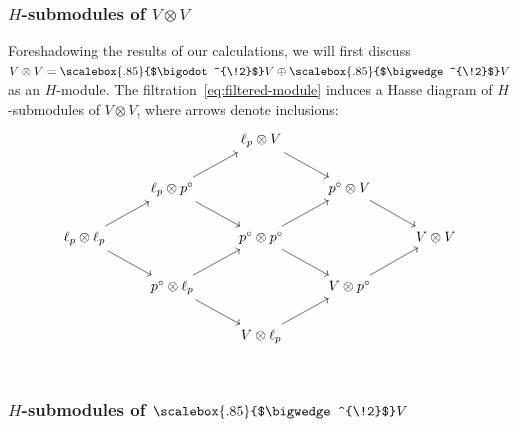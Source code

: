 \documentclass[11pt,reqno,a4paper,final]{amsart}
\newcommand\ext[1]{\scalebox{.85}{$\bigwedge^{\!#1}$}}
\newcommand\sym[1]{\scalebox{.85}{$\bigodot^{\!#1}$}}
\theoremstyle{plain}
\theoremstyle{definition}
\newcommand{\1}{\mathbb{1}}
\numberwithin{equation}{section}
\begin{document}
\subsubsection{$H$-submodules of $V \otimes V$}
\label{sec:some-submodules-v}

Foreshadowing the results of our calculations, we will first discuss
$V \otimes V = \sym{2} V \oplus \ext{2}V$ as an $H$-module. The
filtration~\eqref{eq:filtered-module} induces a Hasse diagram of
$H$-submodules of $V \otimes V$, where arrows denote inclusions:
\begin{equation}
  \label{eq:VtensorV-as-H-mod}
  \begin{tikzcd}
    & & \ell_p \otimes V \arrow[rd] & & \\
    & \ell_p \otimes p^\circ  \arrow[rd] \arrow[ru] & & p^\circ \otimes V \arrow[dr] & \\
    \ell_p \otimes \ell_p \arrow[ru] \arrow[rd] & & p^\circ \otimes p^\circ \arrow[ru] \arrow[rd] & & V \otimes V\\
    & p^\circ \otimes \ell_p \arrow[rd] \arrow[ru] & & V \otimes p^\circ \arrow[ru] & \\
    & & V \otimes \ell_p \arrow[ru] & & \\
  \end{tikzcd}
\end{equation}

\subsubsection{$H$-submodules of $\ext{2}V$}
\label{sec:submodules-skew-2-v}
\end{document}
